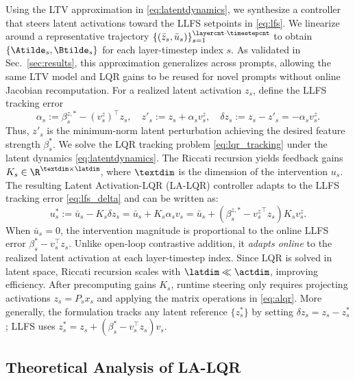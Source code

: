 \documentclass{article}
\begin{document}
Using the LTV approximation in \eqref{eq:latentdynamics}, we synthesize
a controller that steers latent activations toward the LLFS setpoints in
\eqref{eq:lfs}. We linearize around a representative trajectory
$\{(\bar z_s,\bar u_s)\}_{s=1}^{\layercnt\cdot\timestepcnt}$ to obtain
$\{\Atilde_s,\Btilde_s\}$ for each layer-timestep index $s$. As
validated in Sec.~\ref{sec:results}, this approximation generalizes
across prompts, allowing the same LTV model and LQR gains to be reused
for novel prompts without online Jacobian recomputation. For a realized
latent activation $z_s$, define the LLFS tracking error 
\begin{equation}
    \alpha_s := \beta_s^{z,*} - (v_s^z)^\top z_s,
    \quad
    z'_s := z_s + \alpha_s v_s^z,
    \quad
    \delta z_s := z_s - z'_s = -\alpha_s v_s^z.
    \label{eq:lfs_delta}
\end{equation}
Thus, $z'_s$ is the minimum-norm latent perturbation achieving the
desired feature strength $\beta_s^\ast$. We solve the LQR tracking
problem \eqref{eq:lqr_tracking} under the latent dynamics
\eqref{eq:latentdynamics}. 
The Riccati recursion yields feedback gains
$K_s\in\R^{\textdim\times\latdim}$, where $\textdim$ is the
dimension of the intervention $u_s$. The resulting Latent Activation-LQR (LA-LQR)
controller adapts to the LLFS tracking error \eqref{eq:lfs_delta} and can be written as:
\begin{equation}\label{eq:alqr}
    u_s^\ast
    :=
    \bar u_s - K_s\delta z_s
    =
    \bar u_s + K_s \alpha_s v_s 
    =
    \bar u_s + (\beta_s^{z,\ast} - {v_s^z}^\top z_s)K_sv_s^z .
\end{equation}
When $\bar u_s=0$, the intervention magnitude is proportional to the
online LLFS error $\beta_s^\ast-v_s^\top z_s$. Unlike open-loop
contrastive addition, it \textit{adapts online} to the realized latent activation at each
layer-timestep index. Since LQR is solved in latent space, Riccati
recursion scales with $\latdim\ll\actdim$, improving efficiency. After precomputing gains $K_s$,
runtime steering only requires projecting activations $z_s=P_sx_s$ and applying the matrix operations in 
\eqref{eq:alqr}. More generally, the formulation tracks any latent
reference $\{z_s^\ast\}$ by setting $\delta z_s=z_s-z_s^\ast$; LLFS uses
$z_s^\ast=z_s+(\beta_s^\ast-v_s^\top z_s)v_s$.

\subsection{Theoretical Analysis of LA-LQR}
\label{sec:theory}
\end{document}
